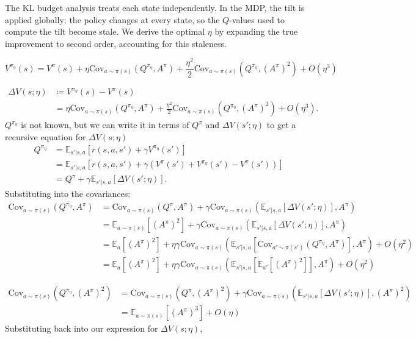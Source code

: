 \documentclass[11pt]{article}
\theoremstyle{definition}
\theoremstyle{remark}
\newcommand{\E}{\mathbb{E}}
\begin{document}
The KL budget analysis treats each state independently. In the MDP, the tilt is applied globally: the policy changes at every state, so the $Q$-values used to compute the tilt become stale. We derive the optimal $\eta$ by expanding the true improvement to second order, accounting for this staleness.

\begin{equation}\label{eq:V_pi_eta}
  V^{\pi_\eta}(s) = V^\pi(s) + \eta\mathrm{Cov}_{a\sim\pi(s)}(Q^{\pi_\eta},A^\pi) + \frac{\eta^2}{2}\mathrm{Cov}_{a\sim\pi(s)}(Q^{\pi_\eta},(A^\pi)^2) + O(\eta^3)
\end{equation}

\begin{align}
  \Delta V(s;\eta) 
  &\coloneqq V^{\pi_\eta}(s) - V^\pi(s) \nonumber\\
  &= \eta\mathrm{Cov}_{a\sim\pi(s)}(Q^{\pi_\eta},A^\pi) + \frac{\eta^2}{2}\mathrm{Cov}_{a\sim\pi(s)}(Q^{\pi_\eta},(A^\pi)^2) + O(\eta^3).
\end{align}
$Q^{\pi_\eta}$ is not known, but we can write it in terms of $Q^\pi$ and $\Delta V(s';\eta)$ to get a recursive equation for $\Delta V(s;\eta)$
\begin{align}
  Q^{\pi_\eta}
  &= \E_{s'|s,a}[r(s,a,s') + \gamma V^{\pi_\eta}(s')]\nonumber\\
  &= \E_{s'|s,a}[r(s,a,s') + \gamma(V^\pi(s') + V^{\pi_\eta}(s') -V^\pi(s'))]\nonumber\\
  &= Q^\pi + \gamma \E_{s'|s,a}[\Delta V(s';\eta)].
\end{align}
Substituting into the covariances:
\begin{align}
    \mathrm{Cov}_{a\sim\pi(s)}(Q^{\pi_\eta},A^\pi) 
    &= \mathrm{Cov}_{a\sim\pi(s)}(Q^\pi,A^\pi) + \gamma\mathrm{Cov}_{a\sim\pi(s)}(\E_{s'|s,a}[\Delta V(s';\eta)],A^\pi)\nonumber\\
    &= \E_{a\sim\pi(s)}[(A^\pi)^2] + \gamma\mathrm{Cov}_{a\sim\pi(s)}(\E_{s'|s,a}[\Delta V(s';\eta)],A^\pi)\nonumber\\
    &= \E_a[(A^\pi)^2] + \eta\gamma\mathrm{Cov}_{a\sim\pi(s)}(\E_{s'|s,a}[\mathrm{Cov}_{a'\sim\pi(s')}(Q^{\pi_\eta},A^\pi)],A^\pi) + O(\eta^2)\nonumber\\
    &= \E_a[(A^\pi)^2] + \eta\gamma\mathrm{Cov}_{a\sim\pi(s)}(\E_{s'|s,a}[\E_{a'}[(A^\pi)^2]],A^\pi) + O(\eta^2)
\end{align}

\begin{align}
    \mathrm{Cov}_{a\sim\pi(s)}(Q^{\pi_\eta},(A^\pi)^2) 
    &= \mathrm{Cov}_{a\sim\pi(s)}(Q^\pi,(A^\pi)^2) + \gamma\mathrm{Cov}_{a\sim\pi(s)}(\E_{s'|s,a}[\Delta V(s';\eta)],(A^\pi)^2)\nonumber\\
    &= \E_{a\sim\pi(s)}[(A^\pi)^3] + O(\eta)
\end{align}
Substituting back into our expression for $\Delta V(s;\eta)$,
\end{document}
